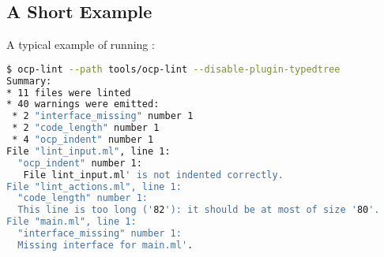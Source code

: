 \subsection{A Short Example}

A typical example of running \ocplint{}:
\begin{lstlisting}[language=bash,basicstyle=\tt\small]
$ ocp-lint --path tools/ocp-lint --disable-plugin-typedtree
Summary:
* 11 files were linted
* 40 warnings were emitted:
 * 2 "interface_missing" number 1
 * 2 "code_length" number 1
 * 4 "ocp_indent" number 1
File "lint_input.ml", line 1:
  "ocp_indent" number 1:
   File lint_input.ml' is not indented correctly.
File "lint_actions.ml", line 1:
  "code_length" number 1:
  This line is too long ('82'): it should be at most of size '80'.
File "main.ml", line 1:
  "interface_missing" number 1:
  Missing interface for main.ml'.
\end{lstlisting}                %
